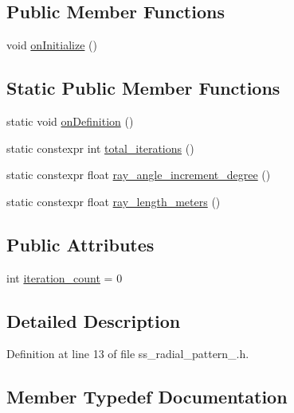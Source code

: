 \subsection*{Public Member Functions}
\begin{DoxyCompactItemize}
\item 
void \hyperlink{structsm__dance__bot_1_1SS2_1_1SsRadialPattern2_a2d11a340f0d3dd87f4b023d89f97843d}{on\+Initialize} ()
\end{DoxyCompactItemize}
\subsection*{Static Public Member Functions}
\begin{DoxyCompactItemize}
\item 
static void \hyperlink{structsm__dance__bot_1_1SS2_1_1SsRadialPattern2_ab85b08ae0877ad97807c2f7347814dcf}{on\+Definition} ()
\item 
static constexpr int \hyperlink{structsm__dance__bot_1_1SS2_1_1SsRadialPattern2_ad0857d841dbc555f236b625d1f6b1ba8}{total\+\_\+iterations} ()
\item 
static constexpr float \hyperlink{structsm__dance__bot_1_1SS2_1_1SsRadialPattern2_ae8c3743cac9f0b7680a169b8f73a7674}{ray\+\_\+angle\+\_\+increment\+\_\+degree} ()
\item 
static constexpr float \hyperlink{structsm__dance__bot_1_1SS2_1_1SsRadialPattern2_a4b9c96b0491d19e76f5b7811c6ed22a7}{ray\+\_\+length\+\_\+meters} ()
\end{DoxyCompactItemize}
\subsection*{Public Attributes}
\begin{DoxyCompactItemize}
\item 
int \hyperlink{structsm__dance__bot_1_1SS2_1_1SsRadialPattern2_afae1dd33bea98f712ba2938a35c0ddc1}{iteration\+\_\+count} = 0
\end{DoxyCompactItemize}


\subsection{Detailed Description}


Definition at line 13 of file ss\+\_\+radial\+\_\+pattern\+\_.\+h.



\subsection{Member Typedef Documentation}
